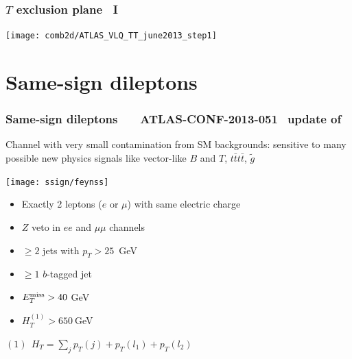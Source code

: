 \documentclass[xcolor=dvipsnames,10pt]{beamer}
\begin{document}
\begin{frame}\frametitle{$T$ exclusion plane~\cite{combination} I}
\footnotesize\centering

\texttt{[image: comb2d/ATLAS\_VLQ\_TT\_june2013\_step1]}

\end{frame}


\section{Same-sign dileptons}
\begin{frame}\frametitle{Same-sign dileptons$\qquad$\small ATLAS-CONF-2013-051~\cite{ATLAS-CONF-2013-051}$\;$\tiny update of~\cite{ATLAS-CONF-2012-130}}
\footnotesize\centering

Channel with very small contamination from SM backgrounds: sensitive to many possible new physics signals like vector-like $B$ and $T$, $t\bar{t}t\bar{t}$, $\tilde{g}$

\scriptsize
\begin{minipage}{.32\textwidth}\centering
\texttt{[image: ssign/feynss]}
  \end{minipage}\begin{minipage}{.24\textwidth}
       \begin{itemize}
       \item Exactly 2 leptons ($e$ or $\mu$) with same electric charge
       \item $Z$ veto in $ee$ and $\mu\mu$ channels
       \end{itemize}
     \end{minipage}\begin{minipage}{.22\textwidth}
       \begin{itemize}
       \item $\geq 2$ jets with $p_T>25$~GeV
       \item $\geq 1$ $b$-tagged jet 
       \end{itemize} 
     \end{minipage}\begin{minipage}{.22\textwidth}
       \begin{itemize}
       \item ${E}^{\rm miss}_T > 40~$GeV
       \item $H_T^{(1)}> 650~$GeV
       \end{itemize} 
  \end{minipage}
         


\tiny
\begin{flushright}
$(1)\ \ H_T=\sum_j p_T(j) + p_T(l_1) + p_T(l_2)$
\end{flushright}

\end{frame}
\end{document}
